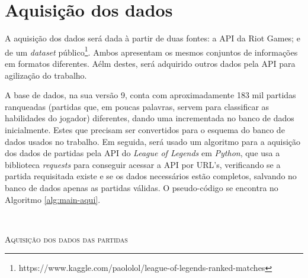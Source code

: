 \section{Aquisição dos dados}
\label{chap:aquisicao}
A aquisição dos dados será dada à partir de duas fontes: a API da Riot Games; e de um \textit{dataset} público\footnote{https://www.kaggle.com/paololol/league-of-legends-ranked-matches}. Ambos apresentam os mesmos conjuntos de informações em formatos diferentes. Aélm destes, será adquirido outros dados pela API para agilização do trabalho.

A base de dados, na sua versão 9, conta com aproximadamente 183 mil partidas ranqueadas (partidas que, em poucas palavras, servem para classificar as habilidades do jogador) diferentes, dando uma incrementada no banco de dados inicialmente. Estes que precisam ser convertidos para o esquema do banco de dados usados no trabalho.
Em seguida, será usado um algoritmo para a aquisição dos dados de partidas pela API do \textit{League of Legends} em \textit{Python}, que usa a biblioteca \textit{requests} para conseguir acessar a API por URL's, verificando se a partida requisitada existe e se os dados necessários estão completos, salvando no banco de dados apenas as partidas válidas. O pseudo-código se encontra no Algoritmo \ref{alg:main-aqui}.

\


\begin{algorithm}[H]
   \SetAlgoLined
   \label{alg:main-aqui}
   \caption{\textsc{Aquisição dos dados das partidas}}
 \end{algorithm}

